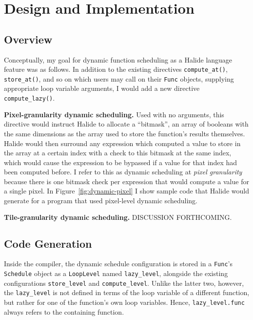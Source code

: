 \documentclass{article}
\begin{document}
\section{Design and Implementation}


\subsection{Overview}

Conceptually, my goal for dynamic function scheduling as a Halide language feature was as follows. In addition to the existing directives \texttt{compute\_at()}, \texttt{store\_at()}, and so on which users may call on their \texttt{Func} objects, supplying appropriate loop variable arguments, I would add a new directive \texttt{compute\_lazy()}.

{\bf Pixel-granularity dynamic scheduling.} Used with no arguments, this directive would instruct Halide to allocate a ``bitmask'', an array of booleans with the same dimensions as the array used to store the function's results themselves. Halide would then surround any expression which computed a value to store in the array at a certain index with a check to this bitmask at the same index, which would cause the expression to be bypassed if a value for that index had been computed before. I refer to this as dynamic scheduling at {\em pixel granularity} because there is one bitmask check per expression that would compute a value for a single pixel. In Figure~\ref{fig:dynamic-pixel} I show sample code that Halide would generate for a program that used pixel-level dynamic scheduling.

{\bf Tile-granularity dynamic scheduling.} DISCUSSION FORTHCOMING.

\subsection{Code Generation}

Inside the compiler, the dynamic schedule configuration is stored in a \texttt{Func}'s \texttt{Schedule} object as a \texttt{LoopLevel} named \texttt{lazy\_level}, alongside the existing configurations \texttt{store\_level} and \texttt{compute\_level}. Unlike the latter two, however, the \texttt{lazy\_level} is not defined in terms of the loop variable of a different function, but rather for one of the function's own loop variables. Hence, \texttt{lazy\_level.func} always refers to the containing function.
\end{document}
